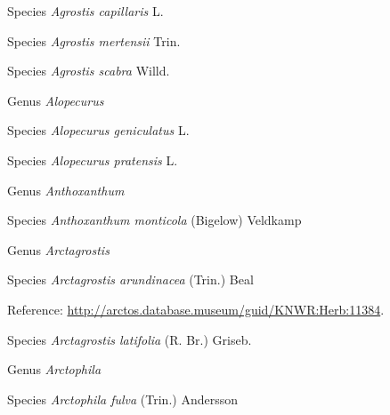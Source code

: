 \documentclass[9pt, article]{memoir}
\begin{document}
\begin{multicols}{2}
\vspace{6pt}\noindent\hspace{36pt}Species \textit{Agrostis capillaris} L.


\vspace{6pt}\noindent\hspace{36pt}Species \textit{Agrostis mertensii} Trin.


\vspace{6pt}\noindent\hspace{36pt}Species \textit{Agrostis scabra} Willd.


\vspace{6pt}\noindent\hspace{30pt}Genus \textit{Alopecurus}


\vspace{6pt}\noindent\hspace{36pt}Species \textit{Alopecurus geniculatus} L.


\vspace{6pt}\noindent\hspace{36pt}Species \textit{Alopecurus pratensis} L.


\vspace{6pt}\noindent\hspace{30pt}Genus \textit{Anthoxanthum}


\vspace{6pt}\noindent\hspace{36pt}Species \textit{Anthoxanthum monticola} (Bigelow) Veldkamp


\vspace{6pt}\noindent\hspace{30pt}Genus \textit{Arctagrostis}


\vspace{6pt}\noindent\hspace{36pt}Species \textit{Arctagrostis arundinacea} (Trin.) Beal


\vspace{6pt}Reference: 
\url{http://arctos.database.museum/guid/KNWR:Herb:11384}.

\vspace{6pt}\noindent\hspace{36pt}Species \textit{Arctagrostis latifolia} (R. Br.) Griseb.


\vspace{6pt}\noindent\hspace{30pt}Genus \textit{Arctophila}


\vspace{6pt}\noindent\hspace{36pt}Species \textit{Arctophila fulva} (Trin.) Andersson



\end{multicols}
\end{document}
